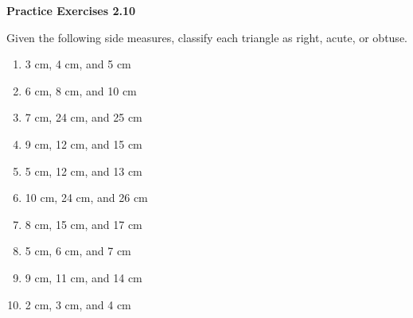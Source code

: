  \vspace{1ex}
\noindent\textbf{Practice Exercises 2.10}

\vspace{0.75ex}


Given the following side measures, classify each triangle as right, acute, or obtuse.
\begin{multicols}{2}
\begin{enumerate}[noitemsep, label = \color{blue}\arabic*. ]
    \item 3 cm, 4 cm, and 5 cm
    \item 6 cm, 8 cm, and 10 cm
    \item 7 cm, 24 cm, and 25 cm
    \item 9 cm, 12 cm, and 15 cm
    \item 5 cm, 12 cm, and 13 cm
    \item 10 cm, 24 cm, and 26 cm
    \item 8 cm, 15 cm, and 17 cm
    \item 5 cm, 6 cm, and 7 cm
    \item 9 cm, 11 cm, and 14 cm
    \item 2 cm, 3 cm, and 4 cm
\end{enumerate}

\end{multicols}
 
